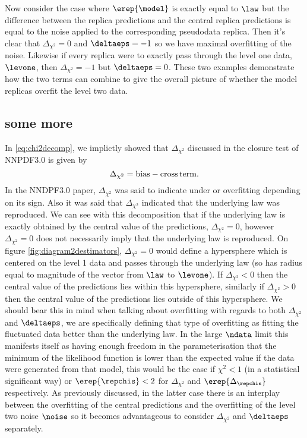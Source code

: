 Now consider the case where $\erep{\model}$ is exactly
equal to $\law$ but the difference between the replica predictions and the
central replica predictions is equal to the noise applied to the corresponding
pseudodata replica. Then it's clear that $\Delta_{\chi^2}=0$ and $\deltaeps=-1$
so we have maximal overfitting of the noise. Likewise if every replica were to
exactly pass through the level one data, $\levone$, then $\Delta_{\chi^2}=-1$
but $\deltaeps=0$. These two examples demonstrate how the two terms can combine
to give the overall picture of whether the model replicas overfit the level two
data.

\subsection{some more}



In \eqref{eq:chi2decomp}, we implictly showed that $\Delta_{\chi^2}$ discussed
in the closure test of NNPDF3.0 is given by
\begin{equation}
    \Delta_{\chi^2} = {\rm bias} - {\rm cross\,term}.
\end{equation}
In the NNDPF3.0 paper, $\Delta_{\chi^2}$ was said to indicate under or overfitting
depending on its sign. Also it was said that $\Delta_{\chi^2}$ indicated that
the underlying law was reproduced. We can see with this decomposition that
if the underlying law is exactly obtained by the central value of the predictions,
$\Delta_{\chi^2}=0$, however $\Delta_{\chi^2}=0$ does not necessarily imply that
the underlying law is reproduced. On figure \ref{fig:diagram2destimators},
$\Delta_{\chi^2} = 0$ would define a hypersphere which is centered on the level
1 data and passes through the underlying law (so has radius equal to magnitude of
the vector from $\law$ to $\levone$). If $\Delta_{\chi^2} < 0$ then the central
value of the predictions lies within this hypersphere, similarly if
$\Delta_{\chi^2} > 0$ then the central value of the predictions lies outside
of this hypersphere. We should bear this in mind when talking about overfitting
with regards to both $\Delta_{\chi^2}$ and $\deltaeps$, we are specifically
defining that type of overfitting as fitting the fluctuated data better than
the underlying law. In the large $\ndata$ limit this manifests itself as
having enough freedom in the parameterisation that the minimum of the likelihood
function is lower than the expected value if the data were generated from that
model, this would be the case if $\chi^2 < 1$
(in a statistical significant way) or $\erep{\repchis} < 2$ for
$\Delta_{\chi^2}$ and $\erep{\Delta_{\repchis}}$ respectively. As previously discussed,
in the latter case there is an interplay between the overfitting of the central
predictions and the overfitting of the level two noise $\noise$ so it becomes
advantageous to consider $\Delta_{\chi^2}$ and $\deltaeps$ separately.
